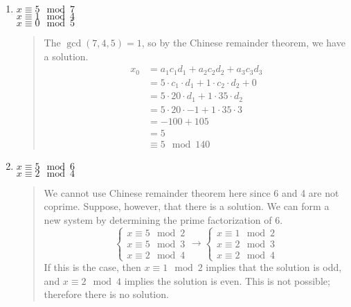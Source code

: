 \documentclass{hw}
\begin{document}
\begin{enumerate}
\begin{enumerate}
\item $x\equiv 5\mod7$\\
$x\equiv1\mod4$\\
$x\equiv0\mod5$
\begin{quote}
The $\gcd{(7,4,5)}=1$, so by the Chinese remainder theorem, we have a solution.
\begin{align*}
x_{0}&=a_{1}c_{1}d_{1}+a_{2}c_{2}d_{2}+a_{3}c_{3}d_{3}\\
&=5\cdot c_{1}\cdot d_{1} + 1\cdot c_{2}\cdot d_{2} + 0\\
&=5\cdot20\cdot d_{1}+1\cdot35\cdot d_{2}\\
&=5\cdot20\cdot-1 + 1\cdot35\cdot3\\
&=-100+105\\
&=5\\
&\equiv5\mod140
\end{align*}
\end{quote}

\item $x\equiv5\mod6$\\
$x\equiv2\mod4$
\begin{quote}
We cannot use Chinese remainder theorem here since 6 and 4 are not coprime. Suppose, however, that
there is a solution. We can form a new system by determining the prime factorization of 6.
\[
\begin{cases}
x\equiv5\mod2\\
x\equiv5\mod3\\
x\equiv2\mod4
\end{cases}
\to
\begin{cases}
x\equiv1\mod2\\
x\equiv2\mod3\\
x\equiv2\mod4
\end{cases}
\]
If this is the case, then $x\equiv1\mod2$ implies that the solution is odd, and $x\equiv2\mod4$ implies
the solution is even. This is not possible; therefore there is no solution.
\end{quote}


\end{enumerate}
\end{enumerate}
\end{document}

